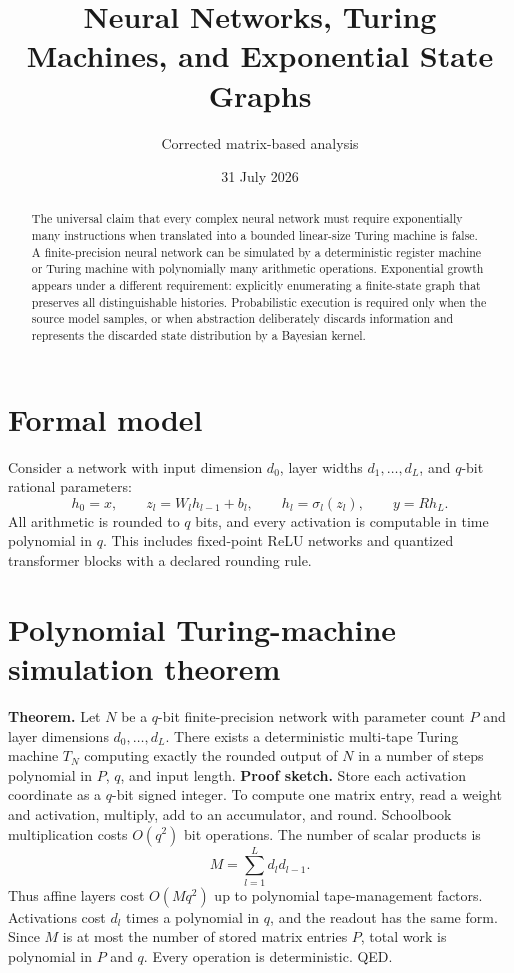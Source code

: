 \documentclass[11pt]{article}
\title{Neural Networks, Turing Machines, and Exponential State Graphs}
\author{Corrected matrix-based analysis}
\date{31 July 2026}
\begin{document}
\maketitle
\begin{abstract}
The universal claim that every complex neural network must require exponentially many instructions when translated into a bounded linear-size Turing machine is false. A finite-precision neural network can be simulated by a deterministic register machine or Turing machine with polynomially many arithmetic operations. Exponential growth appears under a different requirement: explicitly enumerating a finite-state graph that preserves all distinguishable histories. Probabilistic execution is required only when the source model samples, or when abstraction deliberately discards information and represents the discarded state distribution by a Bayesian kernel.
\end{abstract}
\section{Formal model}
Consider a network with input dimension $d_0$, layer widths $d_1,\ldots,d_L$, and $q$-bit rational parameters:
\[
h_0=x,\qquad z_l=W_lh_{l-1}+b_l,\qquad h_l=\sigma_l(z_l),\qquad y=Rh_L.
\]
All arithmetic is rounded to $q$ bits, and every activation is computable in time polynomial in $q$. This includes fixed-point ReLU networks and quantized transformer blocks with a declared rounding rule.
\section{Polynomial Turing-machine simulation theorem}
\textbf{Theorem.} Let $N$ be a $q$-bit finite-precision network with parameter count $P$ and layer dimensions $d_0,\ldots,d_L$. There exists a deterministic multi-tape Turing machine $T_N$ computing exactly the rounded output of $N$ in a number of steps polynomial in $P$, $q$, and input length.
\textbf{Proof sketch.} Store each activation coordinate as a $q$-bit signed integer. To compute one matrix entry, read a weight and activation, multiply, add to an accumulator, and round. Schoolbook multiplication costs $O(q^2)$ bit operations. The number of scalar products is
\[
M=\sum_{l=1}^{L}d_ld_{l-1}.
\]
Thus affine layers cost $O(Mq^2)$ up to polynomial tape-management factors. Activations cost $d_l$ times a polynomial in $q$, and the readout has the same form. Since $M$ is at most the number of stored matrix entries $P$, total work is polynomial in $P$ and $q$. Every operation is deterministic. QED.
\end{document}

